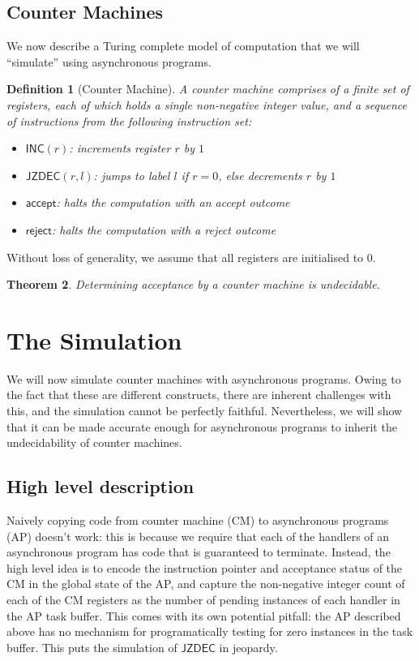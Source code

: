 \documentclass{article}
\newtheorem{definition}{Definition}[section]
\newtheorem{theorem}[definition]{Theorem}
\theoremstyle{remark}
\newcommand{\inc}{\mathsf{INC}}
\newcommand{\jzdec}{\mathsf{JZDEC}}
\newcommand{\accept}{\mathsf{accept}}
\newcommand{\reject}{\mathsf{reject}}
\begin{document}
\subsection{Counter Machines}
We now describe a Turing complete model of computation that we will ``simulate'' using asynchronous programs.

\begin{definition}[Counter Machine]
A counter machine comprises of a finite set of registers, each of which holds a single non-negative integer value, and a sequence of instructions from the following instruction set:
\begin{itemize}
\item $\inc(r)$: increments register $r$ by $1$
\item $\jzdec(r, l)$: jumps to label $l$ if $r = 0$, else decrements $r$ by $1$
\item $\accept$: halts the computation with an accept outcome
\item $\reject$: halts the computation with a reject outcome
\end{itemize}
\end{definition}

Without loss of generality, we assume that all registers are initialised to $0$.

\begin{theorem}
Determining acceptance by a counter machine is undecidable.
\end{theorem}

\section{The Simulation}
We will now simulate counter machines with asynchronous programs. Owing to the fact that these are different constructs, there are inherent challenges with this, and the simulation cannot be perfectly faithful. Nevertheless, we will show that it can be made accurate enough for asynchronous programs to inherit the undecidability of counter machines. 

\subsection{High level description}
Naively copying code from counter machine (CM) to asynchronous programs (AP) doesn't work: this is because we require that each of the handlers of an asynchronous program has code that is guaranteed to terminate. Instead, the high level idea is to encode the instruction pointer and acceptance status of the CM in the global state of the AP, and capture the non-negative integer count of each of the CM registers as the number of pending instances of each handler in the AP task buffer. This comes with its own potential pitfall: the AP described above has no mechanism for programatically testing for zero instances in the task buffer. This puts the simulation of $\jzdec$ in jeopardy.
\end{document}
